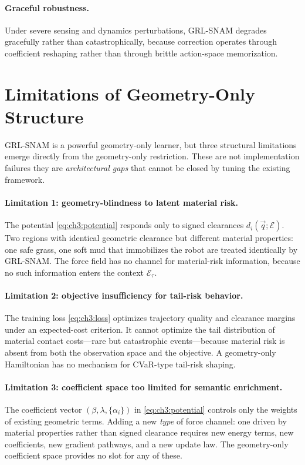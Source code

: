 \paragraph{Graceful robustness.}
Under severe sensing and dynamics perturbations, GRL-SNAM degrades
gracefully rather than catastrophically, because correction operates
through coefficient reshaping rather than through brittle action-space
memorization.

\section{Limitations of Geometry-Only Structure}
\label{sec:ch3:limitations}

GRL-SNAM is a powerful geometry-only learner, but three structural
limitations emerge directly from the geometry-only restriction.
These are not implementation failures they are \emph{architectural gaps}
that cannot be closed by tuning the existing framework.

\paragraph{Limitation 1: geometry-blindness to latent material risk.}
The potential \cref{eq:ch3:potential} responds only to signed clearances
$d_i(\vec{q};\mathcal{E})$.
Two regions with identical geometric clearance but different material
properties: one safe grass, one soft mud that immobilizes the robot are
treated identically by GRL-SNAM.
The force field has no channel for material-risk information, because no
such information enters the context $\mathcal{E}_\tau$.

\paragraph{Limitation 2: objective insufficiency for tail-risk behavior.}
The training loss \cref{eq:ch3:loss} optimizes trajectory quality and
clearance margins under an expected-cost criterion.
It cannot optimize the tail distribution of material contact costs—rare
but catastrophic events—because material risk is absent from both the
observation space and the objective.
A geometry-only Hamiltonian has no mechanism for CVaR-type tail-risk
shaping.

\paragraph{Limitation 3: coefficient space too limited for semantic
enrichment.}
The coefficient vector $(\beta, \lambda, \{\alpha_i\})$ in
\cref{eq:ch3:potential} controls only the weights of existing geometric
terms.
Adding a new \emph{type} of force channel: one driven by material
properties rather than signed clearance requires new energy terms,
new coefficients, new gradient pathways, and a new update law.
The geometry-only coefficient space provides no slot for any of these.

